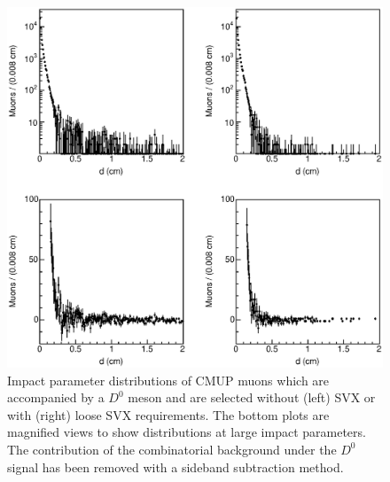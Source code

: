\documentclass[aps,prd,preprint,floatfix,nofootinbib,superscriptaddress,showpacs,amssymb]{revtex4}
\begin{document}
 \begin{figure}
 \begin{center}
 \vspace{-0.3in}
 \leavevmode
 \includegraphics*[width=\textwidth]{fa0_15bis.eps}
 \caption[]{Impact parameter distributions of CMUP muons which are
            accompanied by a $D^0$ meson and are selected without
            (left) SVX  or with (right) loose SVX requirements.
            The bottom plots are magnified views to show distributions at 
            large impact parameters. The contribution of the combinatorial
            background under the $D^0$ signal has been removed with a
            sideband subtraction method. } 
 \label{fig:fig_15bis}
 \end{center}
 \end{figure}
\end{document}
